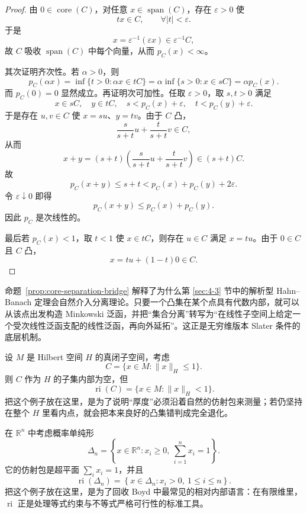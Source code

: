 \begin{proof}
由 $0\in\operatorname{core}(C)$，对任意 $x\in\operatorname{span}(C)$，存在 $\varepsilon>0$ 使
\[
tx\in C,\qquad \forall |t|<\varepsilon.
\]
于是
\[
x=\varepsilon^{-1}(\varepsilon x)\in \varepsilon^{-1}C,
\]
故 $C$ 吸收 $\operatorname{span}(C)$ 中每个向量，从而 $p_C(x)<\infty$。

其次证明齐次性。若 $\alpha>0$，则
\[
p_C(\alpha x)
=
\inf\{t>0:\alpha x\in tC\}
=
\alpha \inf\{s>0:x\in sC\}
=
\alpha p_C(x).
\]
而 $p_C(0)=0$ 显然成立。再证明次可加性。任取 $\varepsilon>0$，取 $s,t>0$ 满足
\[
x\in sC,\quad y\in tC,\quad s<p_C(x)+\varepsilon,\quad t<p_C(y)+\varepsilon.
\]
于是存在 $u,v\in C$ 使 $x=su$、$y=tv$。由于 $C$ 凸，
\[
\frac{s}{s+t}u+\frac{t}{s+t}v\in C,
\]
从而
\[
x+y=(s+t)\left(\frac{s}{s+t}u+\frac{t}{s+t}v\right)\in (s+t)C.
\]
故
\[
p_C(x+y)\le s+t<p_C(x)+p_C(y)+2\varepsilon.
\]
令 $\varepsilon\downarrow 0$ 即得
\[
p_C(x+y)\le p_C(x)+p_C(y).
\]
因此 $p_C$ 是次线性的。

最后若 $p_C(x)<1$，取 $t<1$ 使 $x\in tC$，则存在 $u\in C$ 满足 $x=tu$。由于 $0\in C$ 且 $C$ 凸，
\[
x=tu+(1-t)0\in C.
\]
\end{proof}

\begin{remark}
命题~\ref{prop:core-separation-bridge} 解释了为什么第 \ref{sec:4-3} 节中的解析型 Hahn--Banach 定理会自然介入分离理论。只要一个凸集在某个点具有代数内部，就可以从该点出发构造 Minkowski 泛函，并把“集合分离”转写为“在线性子空间上给定一个受次线性泛函支配的线性泛函，再向外延拓”。这正是无穷维版本 Slater 条件的底层机制。
\end{remark}

\begin{example}\label{ex:relative-interior-subspace}
设 $M$ 是 Hilbert 空间 $H$ 的真闭子空间，考虑
\[
C=\{x\in M:\|x\|_H\le 1\}.
\]
则 $C$ 作为 $H$ 的子集内部为空，但
\[
\operatorname{ri}(C)=\{x\in M:\|x\|_H<1\}.
\]
把这个例子放在这里，是为了说明“厚度”必须沿着自然的仿射包来测量；若仍坚持在整个 $H$ 里看内点，就会把本来良好的凸集错判成完全退化。
\end{example}

\begin{example}\label{ex:simplex-relative-interior}
在 $\mathbb R^n$ 中考虑概率单纯形
\[
\Delta_n=\left\{x\in\mathbb R^n:x_i\ge 0,\ \sum_{i=1}^{n}x_i=1\right\}.
\]
它的仿射包是超平面 $\sum_i x_i=1$，并且
\[
\operatorname{ri}(\Delta_n)=\left\{x\in\Delta_n:x_i>0,\ 1\le i\le n\right\}.
\]
把这个例子放在这里，是为了回收 Boyd 中最常见的相对内部语言：在有限维里，$\operatorname{ri}$ 正是处理等式约束与不等式严格可行性的标准工具。
\end{example}

